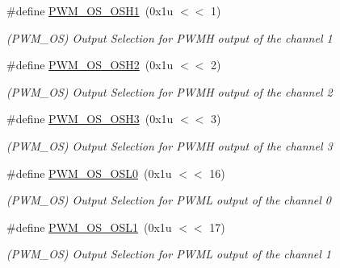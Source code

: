 \begin{DoxyCompactItemize}
\mbox{\label{group__SAME70__PWM_gaf2d959066b2b74f028b75b4cef458006}} 
\#define \mbox{\hyperlink{group__SAME70__PWM_gaf2d959066b2b74f028b75b4cef458006}{P\+W\+M\+\_\+\+O\+S\+\_\+\+O\+S\+H1}}~(0x1u $<$$<$ 1)
\begin{DoxyCompactList}\small\item\em (P\+W\+M\+\_\+\+OS) Output Selection for P\+W\+MH output of the channel 1 \end{DoxyCompactList}\item 
\mbox{\label{group__SAME70__PWM_ga6ea1c76332c521897e0888298fa86f28}} 
\#define \mbox{\hyperlink{group__SAME70__PWM_ga6ea1c76332c521897e0888298fa86f28}{P\+W\+M\+\_\+\+O\+S\+\_\+\+O\+S\+H2}}~(0x1u $<$$<$ 2)
\begin{DoxyCompactList}\small\item\em (P\+W\+M\+\_\+\+OS) Output Selection for P\+W\+MH output of the channel 2 \end{DoxyCompactList}\item 
\mbox{\label{group__SAME70__PWM_gabb61ef4930de967d5130142686da648a}} 
\#define \mbox{\hyperlink{group__SAME70__PWM_gabb61ef4930de967d5130142686da648a}{P\+W\+M\+\_\+\+O\+S\+\_\+\+O\+S\+H3}}~(0x1u $<$$<$ 3)
\begin{DoxyCompactList}\small\item\em (P\+W\+M\+\_\+\+OS) Output Selection for P\+W\+MH output of the channel 3 \end{DoxyCompactList}\item 
\mbox{\label{group__SAME70__PWM_gac5e0b471cd3204dfae585a01b6a1e851}} 
\#define \mbox{\hyperlink{group__SAME70__PWM_gac5e0b471cd3204dfae585a01b6a1e851}{P\+W\+M\+\_\+\+O\+S\+\_\+\+O\+S\+L0}}~(0x1u $<$$<$ 16)
\begin{DoxyCompactList}\small\item\em (P\+W\+M\+\_\+\+OS) Output Selection for P\+W\+ML output of the channel 0 \end{DoxyCompactList}\item 
\mbox{\label{group__SAME70__PWM_ga115f4e7c105beaee094189329a78b554}} 
\#define \mbox{\hyperlink{group__SAME70__PWM_ga115f4e7c105beaee094189329a78b554}{P\+W\+M\+\_\+\+O\+S\+\_\+\+O\+S\+L1}}~(0x1u $<$$<$ 17)
\begin{DoxyCompactList}\small\item\em (P\+W\+M\+\_\+\+OS) Output Selection for P\+W\+ML output of the channel 1 \end{DoxyCompactList}\item 
$$
\end{DoxyCompactItemize}
